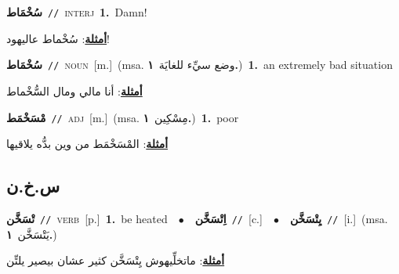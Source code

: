 \documentclass[10pt,a4paper,twoside]{article} %
\begin{document}
\begin{multicols}{2}
{\setlength\topsep{0pt}\textbf{\foreignlanguage{arabic}{سُخْمَاط}}\ {\color{gray}\texttt{//}\color{black}}\ \textsc{interj}\ \textbf{1.}~Damn!\  \begin{flushright}\color{gray}\foreignlanguage{arabic}{\textbf{\underline{\foreignlanguage{arabic}{أمثلة}}}: سُخْماط عاليهود!}\end{flushright}\color{black}} \vspace{2mm}

{\setlength\topsep{0pt}\textbf{\foreignlanguage{arabic}{سُخْمَاط}}\ {\color{gray}\texttt{//}\color{black}}\ \textsc{noun}\ [m.]\ \color{gray}(msa. \foreignlanguage{arabic}{وضع سيِّء للغايَة}~\foreignlanguage{arabic}{\textbf{١.}})\color{black}\ \textbf{1.}~an extremely bad situation\  \begin{flushright}\color{gray}\foreignlanguage{arabic}{\textbf{\underline{\foreignlanguage{arabic}{أمثلة}}}: أنا مالي ومال السُّخْماط}\end{flushright}\color{black}} \vspace{2mm}

{\setlength\topsep{0pt}\textbf{\foreignlanguage{arabic}{مْسَخْمَط}}\ {\color{gray}\texttt{//}\color{black}}\ \textsc{adj}\ [m.]\ \color{gray}(msa. \foreignlanguage{arabic}{مِسْكِين}~\foreignlanguage{arabic}{\textbf{١.}})\color{black}\ \textbf{1.}~poor\  \begin{flushright}\color{gray}\foreignlanguage{arabic}{\textbf{\underline{\foreignlanguage{arabic}{أمثلة}}}: المْسَخْمَط من وين بدُّه يلاقيها}\end{flushright}\color{black}} \vspace{2mm}

\vspace{-3mm}
\subsection*{\color{blue}\foreignlanguage{arabic}{س.خ.ن}\color{blue}{}} 

{\setlength\topsep{0pt}\textbf{\foreignlanguage{arabic}{تْسَخَّن}}\ {\color{gray}\texttt{//}\color{black}}\ \textsc{verb}\ [p.]\ \textbf{1.}~be heated\ \ $\bullet$\ \ \setlength\topsep{0pt}\textbf{\foreignlanguage{arabic}{اِتْسَخَّن}}\ {\color{gray}\texttt{//}\color{black}}\ [c.]\ \ $\bullet$\ \ \setlength\topsep{0pt}\textbf{\foreignlanguage{arabic}{يِتْسَخَّن}}\ {\color{gray}\texttt{//}\color{black}}\ [i.]\ \color{gray}(msa. \foreignlanguage{arabic}{يَتْسَخَّن}~\foreignlanguage{arabic}{\textbf{١.}})\color{black}\  \begin{flushright}\color{gray}\foreignlanguage{arabic}{\textbf{\underline{\foreignlanguage{arabic}{أمثلة}}}: ماتخلِّيهوش يِتْسَخَّن كثير عشان بيصير يلتِّن}\end{flushright}\color{black}} \vspace{2mm}


\end{multicols}
\end{document}

